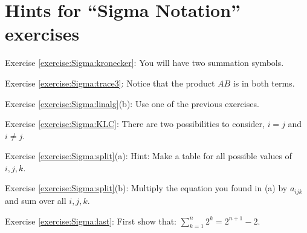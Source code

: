 \section{Hints for ``Sigma Notation'' exercises}\label{sec:sigma:hints} 


\noindent Exercise \ref{exercise:Sigma:kronecker}:  You will have two summation symbols.

\noindent Exercise \ref{exercise:Sigma:trace3}: Notice that the product ${AB}$ is in both terms.

\noindent Exercise \ref{exercise:Sigma:linalg}(b): Use one of the previous exercises.

\noindent Exercise \ref{exercise:Sigma:KLC}: There are two possibilities to consider, $i=j$ and $i \neq j$.

\noindent Exercise \ref{exercise:Sigma:split}(a): Hint: Make a table for all possible values of $i,j,k$.

\noindent Exercise \ref{exercise:Sigma:split}(b): Multiply the equation you found in (a) by $a_{ijk}$ and sum over all $i,j,k$.

\noindent Exercise \ref{exercise:Sigma:last}: First show that:  $\sum_{k=1}^n 2^k = 2^{n+1} - 2$.
